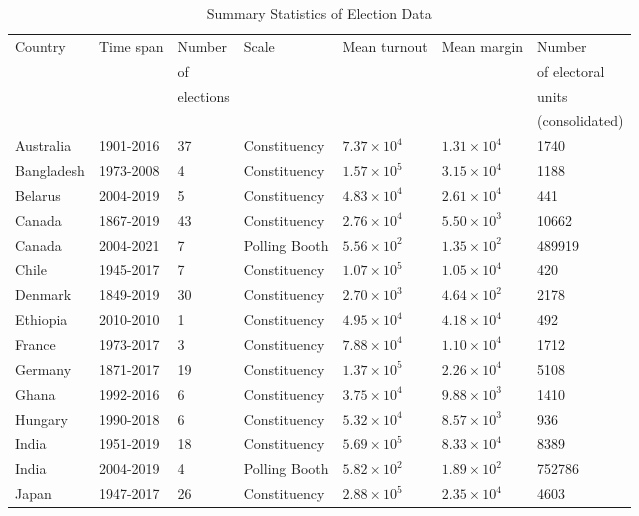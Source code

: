 \begin{table}[h]
\centering
\caption{Summary Statistics of Election Data}
\label{tab:election_stats}
\begin{tabular}{|l|l|l|l|l|l|l|}
\hline
Country & Time span & Number & Scale    & Mean turnout & Mean margin  & Number \\ 
 &  & of  &  &  &  & of electoral \\ 
 &  & elections  &  &  &  & units \\ 
 &  &  &  &  &  & (consolidated) \\ \hline
Australia & 1901-2016 & 37 & Constituency & $7.37\times 10^{4}$ & $1.31\times 10^{4}$ & 1740\\ \hline
Bangladesh & 1973-2008 & 4 & Constituency & $1.57\times 10^{5}$ & $3.15\times 10^{4}$ & 1188\\ \hline
Belarus & 2004-2019 & 5 & Constituency & $4.83\times 10^{4}$ & $2.61\times 10^{4}$ & 441\\ \hline
Canada & 1867-2019 & 43 & Constituency & $2.76\times 10^{4}$ & $5.50\times 10^{3}$ & 10662\\ \hline
Canada & 2004-2021 & 7 & Polling Booth & $5.56\times 10^{2}$ & $1.35\times 10^{2}$ & 489919\\ \hline
Chile & 1945-2017 & 7 & Constituency & $1.07\times 10^{5}$ & $1.05\times 10^{4}$ & 420\\ \hline
Denmark & 1849-2019 & 30 & Constituency & $2.70\times 10^{3}$ & $4.64\times 10^{2}$ & 2178\\ \hline
Ethiopia & 2010-2010 & 1 & Constituency & $4.95\times 10^{4}$ & $4.18\times 10^{4}$ & 492\\ \hline
France & 1973-2017 & 3 & Constituency & $7.88\times 10^{4}$ & $1.10\times 10^{4}$ & 1712\\ \hline
Germany & 1871-2017 & 19 & Constituency & $1.37\times 10^{5}$ & $2.26\times 10^{4}$ & 5108\\ \hline
Ghana & 1992-2016 & 6 & Constituency & $3.75\times 10^{4}$ & $9.88\times 10^{3}$ & 1410\\ \hline
Hungary & 1990-2018 & 6 & Constituency & $5.32\times 10^{4}$ & $8.57\times 10^{3}$ & 936\\ \hline
India & 1951-2019 & 18 & Constituency & $5.69\times 10^{5}$ & $8.33\times 10^{4}$ & 8389\\ \hline
India & 2004-2019 & 4 & Polling Booth & $5.82\times 10^{2}$ & $1.89\times 10^{2}$ & 752786\\ \hline
Japan & 1947-2017 & 26 & Constituency & $2.88\times 10^{5}$ & $2.35\times 10^{4}$ & 4603\\ \hline

\end{tabular}
\end{table}
